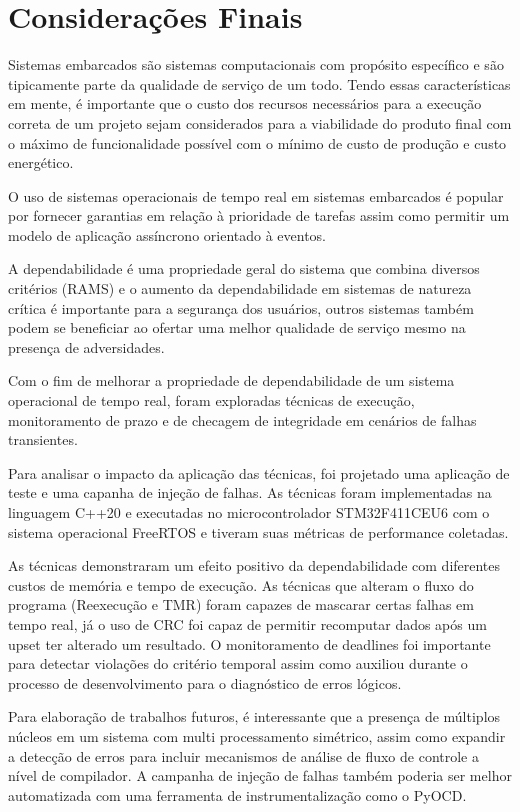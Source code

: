 \chapter{Considerações Finais}
\label{cap:consideracoes}

Sistemas embarcados são sistemas computacionais com propósito específico e são tipicamente parte da qualidade de serviço de um todo. Tendo essas características em mente, é importante que o custo dos recursos necessários para a execução correta de um projeto sejam considerados para a viabilidade do produto final com o máximo de funcionalidade possível com o mínimo de custo de produção e custo energético.

O uso de sistemas operacionais de tempo real em sistemas embarcados é popular por fornecer garantias em relação à prioridade de tarefas assim como permitir um modelo de aplicação assíncrono orientado à eventos.

A dependabilidade é uma propriedade geral do sistema que combina diversos critérios (RAMS) e o aumento da dependabilidade em sistemas de natureza crítica é importante para a segurança dos usuários, outros sistemas também podem se beneficiar ao ofertar uma melhor qualidade de serviço mesmo na presença de adversidades.

Com o fim de melhorar a propriedade de dependabilidade de um sistema operacional de tempo real, foram exploradas técnicas de execução, monitoramento de prazo e de checagem de integridade em cenários de falhas transientes. 

Para analisar o impacto da aplicação das técnicas, foi projetado uma aplicação de teste e uma capanha de injeção de falhas. As técnicas foram implementadas na linguagem C++20 e executadas no microcontrolador STM32F411CEU6 com o sistema operacional FreeRTOS e tiveram suas métricas de performance coletadas.

As técnicas demonstraram um efeito positivo da dependabilidade com diferentes custos de memória e tempo de execução. As técnicas que alteram o fluxo do programa (Reexecução e TMR) foram capazes de mascarar certas falhas em tempo real, já o uso de CRC foi capaz de permitir recomputar dados após um upset ter alterado um resultado. O monitoramento de deadlines foi importante para detectar violações do critério temporal assim como auxiliou durante o processo de desenvolvimento para o diagnóstico de erros lógicos.

Para elaboração de trabalhos futuros, é interessante que a  presença de múltiplos núcleos em um sistema com multi processamento simétrico, assim como expandir a detecção de erros para incluir mecanismos de análise de fluxo de controle a nível de compilador. A campanha de injeção de falhas também poderia ser melhor automatizada com uma ferramenta de instrumentalização como o PyOCD.
